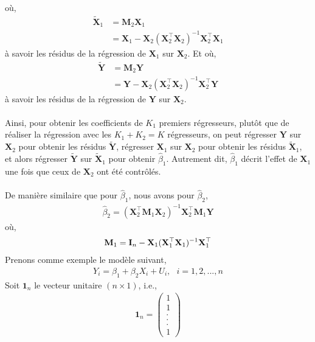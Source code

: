 où,
\begin{align*}
\tilde{\mathbf{X}}_1&=\mathbf{M}_2\mathbf{X}_1\\
&= \mathbf{X}_1 - \mathbf{X}_2(\mathbf{X}_2^\top\mathbf{X}_2)^{-1}\mathbf{X}_2^\top\mathbf{X}_1
\end{align*}
à savoir les résidus de la régression de $\mathbf{X}_1$ sur $\mathbf{X}_2$. Et où,
\begin{align*}
\tilde{\mathbf{Y}}&=\mathbf{M}_2\mathbf{Y}\\
&= \mathbf{Y} - \mathbf{X}_2(\mathbf{X}_2^\top\mathbf{X}_2)^{-1}\mathbf{X}_2^\top\mathbf{Y}
\end{align*}
à savoir les résidus de la régression de $\mathbf{Y}$ sur $\mathbf{X}_2$.\\\\
Ainsi, pour obtenir les coefficients de $K_1$ premiers régresseurs, plutôt que de réaliser la régression avec les $K_1+K_2 =K$ régresseurs, on peut régresser $\mathbf{Y}$ sur $\mathbf{X}_2$ pour obtenir les résidus $\tilde{\mathbf{Y}}$, régresser $\mathbf{X}_1$ sur $\mathbf{X}_2$ pour obtenir les résidus $\tilde{\mathbf{X}}_1$, et alors régresser $\tilde{\mathbf{Y}}$ sur $\tilde{\mathbf{X}}_1$ pour obtenir $\widehat{\beta}_1$. Autrement dit, $\widehat{\beta}_1$ décrit l'effet de $\mathbf{X}_1$ une fois que ceux de $\mathbf{X}_2$ ont été contrôlés.\\\\
De manière similaire que pour $\widehat{\beta}_1$, nous avons pour $\widehat{\beta}_2$,
\begin{align*}
\widehat{\beta}_2 = (\mathbf{X}_2^\top\mathbf{M}_1\mathbf{X}_2)^{-1} \mathbf{X}_2^\top\mathbf{M}_1\mathbf{Y}
\end{align*}
où,
\begin{align*}
\mathbf{M}_1 = \mathbf{I}_n - \mathbf{X}_1(\mathbf{X}_1^\top\mathbf{X}_1)^{-1}\mathbf{X}_1^\top
\end{align*}
Prenons comme exemple le modèle suivant,
\begin{align*}
Y_i = \beta_1 + \beta_2 X_i + U_i, \ \ \ i = 1,2,...,n
\end{align*}
Soit $\mathbf{1}_n$ le vecteur unitaire $(n\times 1)$, i.e.,
\begin{align*}
\mathbf{1}_n =
\left(
\begin{array}{c}
1\\
1\\
.\\
.\\
.\\
1
\end{array}
\right)
\end{align*}
